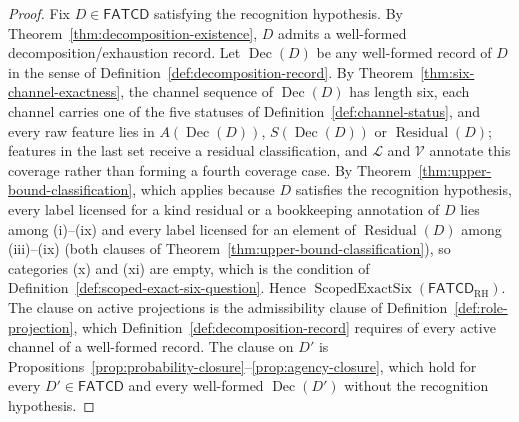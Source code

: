 \documentclass[11pt]{article}
\theoremstyle{definition}
\newcommand{\FATCD}{\ensuremath{\mathsf{FATCD}}}
\newcommand{\Dec}[1]{\ensuremath{\operatorname{Dec}\!\left(#1\right)}}
\newcommand{\Residual}[1]{\ensuremath{\operatorname{Residual}\!\left(#1\right)}}
\newcommand{\ScopedExactSix}[1]{\ensuremath{\operatorname{ScopedExactSix}\!\left(#1\right)}}
\begin{document}
\begin{proof}
Fix \(D \in \FATCD{}\) satisfying the recognition hypothesis. By
Theorem~\ref{thm:decomposition-existence},
\(D\) admits a well-formed decomposition/exhaustion record. Let \(\Dec{D}\) be
any well-formed record of \(D\) in the sense of
Definition~\ref{def:decomposition-record}. By
Theorem~\ref{thm:six-channel-exactness}, the channel sequence of
\(\Dec{D}\) has length six, each channel carries one of the five
statuses of Definition~\ref{def:channel-status}, and every raw feature lies
in \(A(\Dec{D})\), \(S(\Dec{D})\) or \(\Residual{D}\); features in the last
set receive a residual classification, and \(\mathcal L\) and \(\mathcal V\)
annotate this coverage rather than forming a fourth coverage case. By
Theorem~\ref{thm:upper-bound-classification}, which applies because \(D\)
satisfies the recognition hypothesis, every label licensed for a kind residual or a bookkeeping annotation of
\(D\) lies among (i)--(ix) and every label licensed for an element of
\(\Residual{D}\) among (iii)--(ix) (both clauses of Theorem~\ref{thm:upper-bound-classification}), so
categories (x) and (xi) are empty, which is the condition of
Definition~\ref{def:scoped-exact-six-question}. Hence \(\ScopedExactSix{\FATCD_{\mathrm{RH}}}\).
The clause on active projections is the admissibility clause of
Definition~\ref{def:role-projection}, which Definition~\ref{def:decomposition-record}
requires of every active channel of a well-formed record. The clause on \(D'\) is
Propositions~\ref{prop:probability-closure}--\ref{prop:agency-closure}, which hold
for every \(D'\in\FATCD{}\) and every well-formed \(\Dec{D'}\) without the
recognition hypothesis.


\end{proof}
\end{document}
